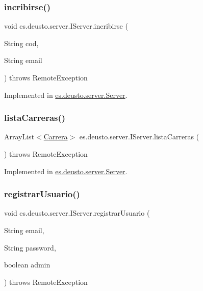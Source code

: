 \subsubsection{\texorpdfstring{incribirse()}{incribirse()}}
{\footnotesize\ttfamily void es.\+deusto.\+server.\+I\+Server.\+incribirse (\begin{DoxyParamCaption}\item[{String}]{cod,  }\item[{String}]{email }\end{DoxyParamCaption}) throws Remote\+Exception}



Implemented in \mbox{\hyperlink{classes_1_1deusto_1_1server_1_1_server_a19df52b26da7c83b2e7f13a6aab45633}{es.\+deusto.\+server.\+Server}}.

\mbox{\label{interfacees_1_1deusto_1_1server_1_1_i_server_a13c17b07c8114d16130053aecdd455bb}} 
\subsubsection{\texorpdfstring{listaCarreras()}{listaCarreras()}}
{\footnotesize\ttfamily Array\+List$<$\mbox{\hyperlink{classes_1_1deusto_1_1server_1_1jdo_1_1_carrera}{Carrera}}$>$ es.\+deusto.\+server.\+I\+Server.\+lista\+Carreras (\begin{DoxyParamCaption}{ }\end{DoxyParamCaption}) throws Remote\+Exception}



Implemented in \mbox{\hyperlink{classes_1_1deusto_1_1server_1_1_server_af62ce3462ec30a081db0009d2f2b33bb}{es.\+deusto.\+server.\+Server}}.

\mbox{\label{interfacees_1_1deusto_1_1server_1_1_i_server_af6743c655c7831fa6d87e6e910bb6db4}} 
\subsubsection{\texorpdfstring{registrarUsuario()}{registrarUsuario()}}
{\footnotesize\ttfamily void es.\+deusto.\+server.\+I\+Server.\+registrar\+Usuario (\begin{DoxyParamCaption}\item[{String}]{email,  }\item[{String}]{password,  }\item[{boolean}]{admin }\end{DoxyParamCaption}) throws Remote\+Exception}



